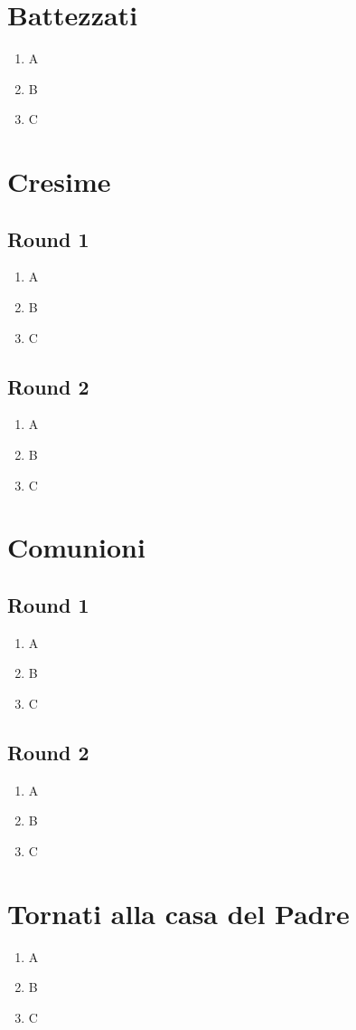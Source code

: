 \section{Battezzati}

\begin{enumerate}
    \item A
    \item B
    \item C
\end{enumerate}

\section{Cresime}

\subsection{Round 1}
\begin{enumerate}
    \item A
    \item B
    \item C
\end{enumerate}

\clearpage
\subsection{Round 2}
\begin{enumerate}
    \item A
    \item B
    \item C
\end{enumerate}

\section{Comunioni}

\subsection{Round 1}
\begin{enumerate}
    \item A
    \item B
    \item C
\end{enumerate}

\subsection{Round 2}
\begin{enumerate}
    \item A
    \item B
    \item C
\end{enumerate}

\section{Tornati alla casa del Padre}

\begin{enumerate}
    \item A
    \item B
    \item C
\end{enumerate}
